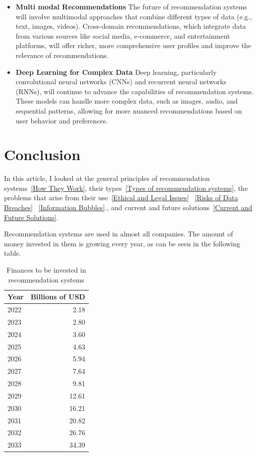 \documentclass[10pt,twoside,slovak,a4paper]{article}
\begin{document}
\begin{itemize}
\item \textbf{Multi modal Recommendations} 
The future of recommendation systems will involve multimodal approaches that combine different types of data (e.g., text, images, videos)\cite{multimodal}. Cross-domain recommendations, which integrate data from various sources like social media, e-commerce, and entertainment platforms, will offer richer, more comprehensive user profiles and improve the relevance of recommendations.


\item \textbf{Deep Learning for Complex Data} 
Deep learning, particularly convolutional neural networks (CNNs)\cite{CNN} and recurrent neural networks (RNNs)\cite{RNN}, will continue to advance the capabilities of recommendation systems. These models can handle more complex data, such as images, audio, and sequential patterns, allowing for more nuanced recommendations based on user behavior and preferences.


\end{itemize}





\section{Conclusion} \label{Conclusion}
In this article, I looked at the general principles of recommendation systems~\ref{How They Work}, their types~\ref{Types of recommendation systems}, the problems that arise from their use~\ref{Ethical and Legal Issues} ~\ref{Risks of Data Breaches} ~\ref{Information Bubbles}., and current and future solutions~\ref{Current and Future Solutions}.

Recommendation systems are used in almost all companies. The amount of money invested in them is growing every year, as can be seen in the following table.


\begin{table}[ht]
\centering
    \begin{tabular}{l|r}
        Year  & Billions of USD \\\hline
        2022  & 2.18   \\
        2023  & 2.80   \\
        2024  & 3.60   \\
        2025  & 4.63   \\
        2026  & 5.94   \\
        2027  & 7.64   \\
        2028  & 9.81   \\
        2029  & 12.61  \\
        2030  & 16.21  \\
        2031  & 20.82  \\
        2032  & 26.76  \\
        2033  & 34.39  \\
    \end{tabular}
    \caption{Finances to be invested in recommendation systems}
    \label{tab:widgets}
\end{table}
\end{document}
